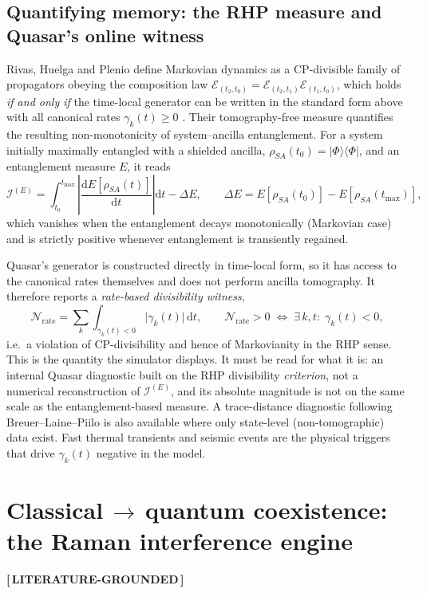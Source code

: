 \documentclass[11pt]{article}
\newcommand{\statusVerified}{\textbf{\color{verified}[\,LITERATURE-GROUNDED\,]}}
\newcommand{\dd}{\mathrm{d}}
\begin{document}
\subsection{Quantifying memory: the RHP measure and Quasar's online witness}
Rivas, Huelga and Plenio define Markovian dynamics as a CP-divisible family of propagators
obeying the composition law $\mathcal{E}_{(t_2,t_0)}=\mathcal{E}_{(t_2,t_1)}\mathcal{E}_{(t_1,t_0)}$,
which holds \emph{if and only if} the time-local generator can be written in the standard form
above with all canonical rates $\gamma_k(t)\ge 0$ \cite{rhp2010}. Their tomography-free measure
quantifies the resulting non-monotonicity of system--ancilla entanglement. For a system
initially maximally entangled with a shielded ancilla, $\rho_{SA}(t_0)=|\Phi\rangle\!\langle\Phi|$,
and an entanglement measure $E$, it reads \cite{rhp2010}
\begin{equation}
\mathcal{I}^{(E)}=\int_{t_0}^{t_{\max}}\left|\frac{\dd E[\rho_{SA}(t)]}{\dd t}\right|\dd t
-\Delta E,
\qquad \Delta E = E[\rho_{SA}(t_0)]-E[\rho_{SA}(t_{\max})],
\end{equation}
which vanishes when the entanglement decays monotonically (Markovian case) and is strictly
positive whenever entanglement is transiently regained.

Quasar's generator is constructed directly in time-local form, so it has access to the
canonical rates themselves and does not perform ancilla tomography. It therefore reports a
\emph{rate-based divisibility witness},
\begin{equation}
\boxed{\;\mathcal{N}_{\mathrm{rate}}=\sum_k\int_{\gamma_k(t)<0}\big|\gamma_k(t)\big|\,\dd t,
\qquad \mathcal{N}_{\mathrm{rate}}>0 \;\Longleftrightarrow\; \exists\,k,t:\;\gamma_k(t)<0,\;}
\end{equation}
i.e.\ a violation of CP-divisibility and hence of Markovianity in the RHP sense. This is the
quantity the simulator displays. It must be read for what it is: an internal Quasar diagnostic
built on the RHP divisibility \emph{criterion}, not a numerical reconstruction of
$\mathcal{I}^{(E)}$, and its absolute magnitude is not on the same scale as the
entanglement-based measure. A trace-distance diagnostic following Breuer--Laine--Piilo
\cite{blp2009} is also available where only state-level (non-tomographic) data exist. Fast
thermal transients and seismic events are the physical triggers that drive $\gamma_k(t)$
negative in the model.

\section{Classical$\,\to\,$quantum coexistence: the Raman interference engine}
\statusVerified
\end{document}
